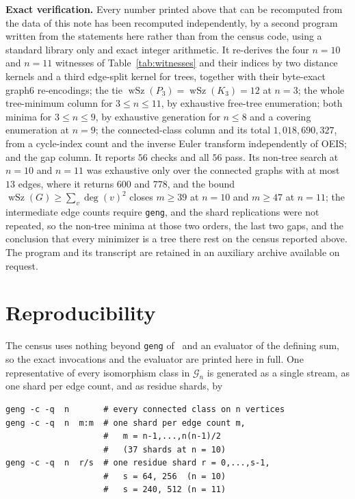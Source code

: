\documentclass[11pt]{amsart}
\newcommand{\wSz}{\operatorname{wSz}}
\newcommand{\G}{\mathcal{G}}
\begin{document}
\noindent
\textbf{Exact verification.}
Every number printed above that can be recomputed from the data of
this note has been recomputed independently, by a second program
written from the statements here rather than from the census code,
using a standard library only and exact integer arithmetic. It
re-derives the four $n=10$ and $n=11$ witnesses of
Table~\ref{tab:witnesses} and their indices by two distance kernels
and a third edge-split kernel for trees, together with their
byte-exact graph6 re-encodings; the tie
$\wSz(P_3)=\wSz(K_3)=12$ at $n=3$; the whole tree-minimum column for
$3\le n\le 11$, by exhaustive free-tree enumeration; both minima for
$3\le n\le 9$, by exhaustive generation for $n\le 8$ and a covering
enumeration at $n=9$; the connected-class column and its total
$1{,}018{,}690{,}327$, from a cycle-index count and the inverse Euler
transform independently of OEIS; and the gap column. It reports $56$
checks and all $56$ pass. Its non-tree search at $n=10$ and $n=11$ was
exhaustive only over the connected graphs with at most $13$ edges,
where it returns $600$ and $778$, and the bound
$\wSz(G)\ge\sum_{v}\deg(v)^2$ closes $m\ge 39$ at $n=10$ and
$m\ge 47$ at $n=11$; the intermediate edge counts require
\texttt{geng}, and the shard replications were not repeated, so the
non-tree minima at those two orders, the last two gaps, and the
conclusion that every minimizer is a tree there rest on the census
reported above. The program and its transcript are retained in an
auxiliary archive available on request.

\section*{Reproducibility}

The census uses nothing beyond \texttt{geng} of~\cite{McKayPiperno2014}
and an evaluator of the defining sum, so the exact invocations and the
evaluator are printed here in full. One representative of
every isomorphism class in $\G_n$ is generated as a single stream, as
one shard per edge count, and as residue shards, by

\begin{verbatim}
geng -c -q  n       # every connected class on n vertices
geng -c -q  n  m:m  # one shard per edge count m,
                    #   m = n-1,...,n(n-1)/2
                    #   (37 shards at n = 10)
geng -c -q  n  r/s  # one residue shard r = 0,...,s-1,
                    #   s = 64, 256  (n = 10)
                    #   s = 240, 512 (n = 11)
\end{verbatim}
\end{document}
